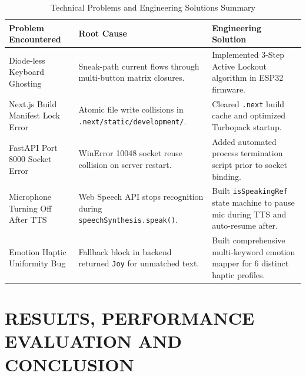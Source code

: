 \documentclass[12pt,a4paper]{report}
\begin{document}
\begin{table}[htbp]
    \centering
    \caption{Technical Problems and Engineering Solutions Summary}
    \vspace{0.2cm}
    \renewcommand{\arraystretch}{1.3}
    \begin{tabular}{|p{}|p{}|p{}|}
        \hline
        \textbf{Problem Encountered} & \textbf{Root Cause} & \textbf{Engineering Solution} \\ \hline
        Diode-less Keyboard Ghosting & Sneak-path current flows through multi-button matrix closures. & Implemented 3-Step Active Lockout algorithm in ESP32 firmware. \\ \hline
        Next.js Build Manifest Lock Error & Atomic file write collisions in \texttt{.next/static/development/}. & Cleared \texttt{.next} build cache and optimized Turbopack startup. \\ \hline
        FastAPI Port 8000 Socket Error & WinError 10048 socket reuse collision on server restart. & Added automated process termination script prior to socket binding. \\ \hline
        Microphone Turning Off After TTS & Web Speech API stops recognition during \texttt{speechSynthesis.speak()}. & Built \texttt{isSpeakingRef} state machine to pause mic during TTS and auto-resume after. \\ \hline
        Emotion Haptic Uniformity Bug & Fallback block in backend returned \texttt{Joy} for unmatched text. & Built comprehensive multi-keyword emotion mapper for 6 distinct haptic profiles. \\ \hline
    \end{tabular}
\end{table}

\clearpage
\chapter{RESULTS, PERFORMANCE EVALUATION AND CONCLUSION}
\end{document}
